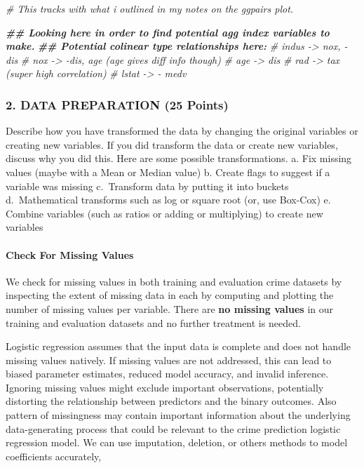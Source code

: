 \documentclass[
]{article}
\newenvironment{Shaded}{\begin{snugshade}}{\end{snugshade}}
\newcommand{\CommentTok}[1]{\textcolor[rgb]{0.56,0.35,0.01}{\textit{#1}}}
\newcommand{\DocumentationTok}[1]{\textcolor[rgb]{0.56,0.35,0.01}{\textbf{\textit{#1}}}}
\begin{document}
\begin{Shaded}
\begin{Highlighting}[]
\CommentTok{\# This tracks with what i outlined in my notes on the ggpairs plot.}

\DocumentationTok{\#\# Looking here in order to find potential agg index variables to make. }
\DocumentationTok{\#\# Potential colinear type relationships here: }
\CommentTok{\# indus {-}\textgreater{} nox, {-} dis}
\CommentTok{\# nox {-}\textgreater{} {-}dis, age (age gives diff info though)}
\CommentTok{\# age {-}\textgreater{} dis}
\CommentTok{\# rad {-}\textgreater{} tax (super high correlation)}
\CommentTok{\# lstat {-}\textgreater{} {-} medv}
\end{Highlighting}
\end{Shaded}

\subsubsection{2. DATA PREPARATION (25
Points)}\label{data-preparation-25-points}

Describe how you have transformed the data by changing the original
variables or creating new variables. If you did transform the data or
create new variables, discuss why you did this. Here are some possible
transformations. a. Fix missing values (maybe with a Mean or Median
value) b. Create flags to suggest if a variable was missing c.~Transform
data by putting it into buckets d.~Mathematical transforms such as log
or square root (or, use Box-Cox) e. Combine variables (such as ratios or
adding or multiplying) to create new variables

\paragraph{Check For Missing Values}\label{check-for-missing-values}

We check for missing values in both training and evaluation crime
datasets by inspecting the extent of missing data in each by computing
and plotting the number of missing values per variable. There are
\textbf{no missing values} in our training and evaluation datasets and
no further treatment is needed.

Logistic regression assumes that the input data is complete and does not
handle missing values natively. If missing values are not addressed,
this can lead to biased parameter estimates, reduced model accuracy, and
invalid inference. Ignoring missing values might exclude important
observations, potentially distorting the relationship between predictors
and the binary outcomes. Also pattern of missingness may contain
important information about the underlying data-generating process that
could be relevant to the crime prediction logistic regression model. We
can use imputation, deletion, or others methods to model coefficients
accurately,
\end{document}
